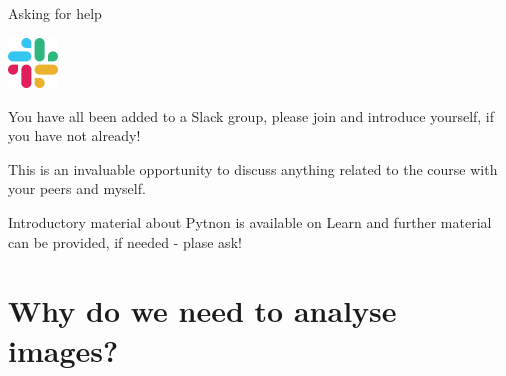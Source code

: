 \documentclass[9pt, aspectratio=169]{beamer}
\begin{document}
\begin{frame}
    {Asking for help}
    \begin{center}
        \includegraphics[width=0.1\textwidth]{slack.png}
    \end{center}

    You have all been added to a Slack group, please join and introduce yourself, if you have not already!

    This is an invaluable opportunity to discuss anything related to the course with your peers and myself.

    Introductory material about Pytnon is available on Learn and further material can be provided, if needed - plase ask!
\end{frame}
\section{Why do we need to analyse images?}
\end{document}
